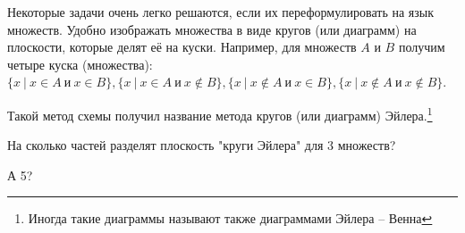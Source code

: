 Некоторые задачи очень легко решаются, если их переформулировать на язык множеств. Удобно изображать множества в виде кругов (или диаграмм) на плоскости, которые делят её на куски. Например, для множеств $A$ и $B$ получим четыре куска (множества): $\{x~|~x \in A~и~x \in B\}, \{x~|~x \in A~и~x \notin B\}, \{x~|~x \notin A~и~x \in B\}, \{x~|~x \notin A~и~x \notin B\}$.

Такой метод схемы получил название метода кругов (или диаграмм) Эйлера.\footnote{Иногда такие диаграммы называют также диаграммами Эйлера – Венна}

\begin{ques}
    На сколько частей разделят плоскость "круги Эйлера" для 3 множеств? 
    \par
    А 5?
\end{ques}

